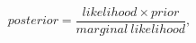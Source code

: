 \begin{equation}
\label{eq:bayestheoremword}
posterior = \frac{likelihood \times prior}{marginal ~ likelihood},
\end{equation}

